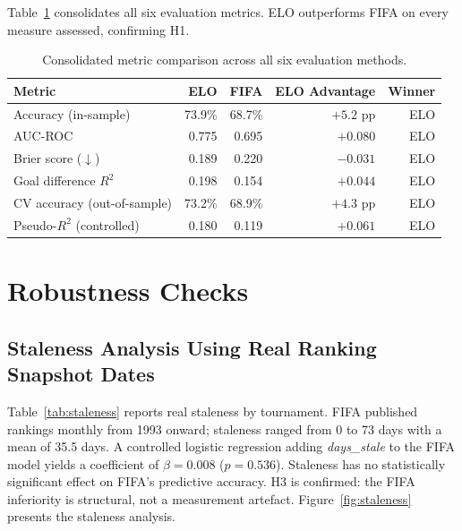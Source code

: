 \documentclass[12pt, a4paper]{article}
\begin{document}
Table~\ref{tab:summary} consolidates all six evaluation metrics. ELO outperforms FIFA on every
measure assessed, confirming H1.

\begin{table}[H]
  \centering
  \caption{Consolidated metric comparison across all six evaluation methods.}
  \label{tab:summary}
  \begin{tabular}{lrrrr}
    \toprule
    Metric & ELO & FIFA & ELO Advantage & Winner \\
    \midrule
    Accuracy (in-sample)        & 73.9\% & 68.7\% & $+5.2$ pp  & ELO \\
    AUC-ROC                     & 0.775  & 0.695  & $+0.080$   & ELO \\
    Brier score ($\downarrow$)  & 0.189  & 0.220  & $-0.031$   & ELO \\
    Goal difference $R^{2}$     & 0.198  & 0.154  & $+0.044$   & ELO \\
    CV accuracy (out-of-sample) & 73.2\% & 68.9\% & $+4.3$ pp  & ELO \\
    Pseudo-$R^{2}$ (controlled) & 0.180  & 0.119  & $+0.061$   & ELO \\
    \bottomrule
  \end{tabular}
\end{table}

\section{Robustness Checks}

\subsection{Staleness Analysis Using Real Ranking Snapshot Dates}

Table~\ref{tab:staleness} reports real staleness by tournament. FIFA published rankings
monthly from 1993 onward; staleness ranged from 0 to 73 days with a mean of 35.5 days. A
controlled logistic regression adding \textit{days\_stale} to the FIFA model yields a
coefficient of $\beta = 0.008$ ($p = 0.536$). Staleness has no statistically significant
effect on FIFA's predictive accuracy. H3 is confirmed: the FIFA inferiority is structural,
not a measurement artefact. Figure~\ref{fig:staleness} presents the staleness analysis.
\end{document}
